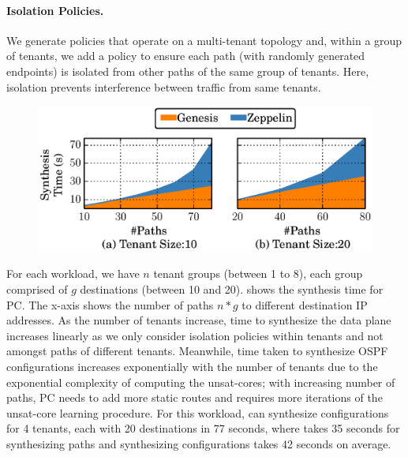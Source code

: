 
\paragraph{Isolation Policies.}
We generate policies that operate 
on a multi-tenant topology and,
within a  group of tenants, we add a policy to ensure
each path  (with randomly generated endpoints)
is isolated from other paths of the same group of tenants.
Here, isolation  prevents interference between traffic from
same tenants.  
 
 \begin{figure}
 	\includegraphics[width=\linewidth]{figures/ospfisolation.eps}
 	\vspace{-8pt}
 \end{figure}
 
For each 
workload, we have $n$ tenant groups (between 1 to 8), 
each group comprised of $g$ destinations (between 10 and 20). 
shows the synthesis time 
for PC.
The x-axis shows the number of paths $n * g$ 
to different destination IP addresses. 
 As the number of tenants increase, time to 
synthesize the data plane increases linearly as we only 
consider isolation policies within tenants 
and not amongst paths 
of different tenants. Meanwhile, time taken to synthesize 
OSPF configurations increases exponentially with the 
number of tenants due to the exponential complexity of computing 
the unsat-cores; with increasing number of 
paths, PC needs to add more static routes 
and requires more iterations of the unsat-core learning
procedure. 
For this workload, \name can
synthesize configurations for 4 tenants, each with
20 destinations in 77 seconds, where \genesis takes 35 seconds
for synthesizing paths and synthesizing configurations
takes 42 seconds on average. 



